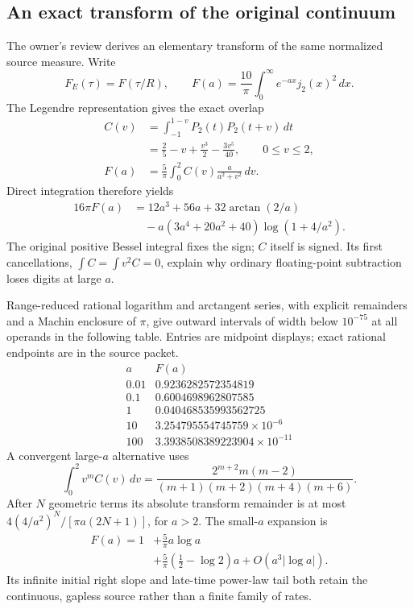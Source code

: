 \subsection{An exact transform of the original continuum}
\label{subsec:actual-continuum-transform-update}
The owner's review derives an elementary transform of the same normalized
source measure. Write
\[
 F_E(\tau)=F(\tau/R),\qquad
 F(a)=\frac{10}{\pi}\int_0^\infty e^{-ax}j_2(x)^2\,dx.
\]
The Legendre representation gives the exact overlap
\begin{align*}
 C(v)&=\int_{-1}^{1-v}P_2(t)P_2(t+v)\,dt\\
 &=\frac25-v+\frac{v^3}{2}-\frac{3v^5}{40},
       \qquad 0\leq v\leq2,\\
 F(a)&=\frac5\pi\int_0^2 C(v)\frac{a}{a^2+v^2}\,dv.
\end{align*}
Direct integration therefore yields
\begin{align}
 16\pi F(a)&=12a^3+56a+32\arctan(2/a)\nonumber\\
 &\quad-a(3a^4+20a^2+40)\log(1+4/a^2).
 \label{eq:exact-continuum-transform-update}
\end{align}
The original positive Bessel integral fixes the sign; $C$ itself is signed.
Its first cancellations, $\int C=\int v^2C=0$, explain why ordinary
floating-point subtraction loses digits at large $a$.

Range-reduced rational logarithm and arctangent series, with explicit
remainders and a Machin enclosure of $\pi$, give outward intervals of
width below $10^{-75}$ at all operands in the following table. Entries
are midpoint displays; exact rational endpoints are in the source packet.
\[
 \begin{array}{c|c}
 a&F(a)\\\hline
 0.01&0.9236282572354819\\
 0.1&0.6004698962807585\\
 1&0.040468535993562725\\
 10&3.254795554745759\times10^{-6}\\
 100&3.3938508389223904\times10^{-11}
 \end{array}
\]
A convergent large-$a$ alternative uses
\[
 \int_0^2v^mC(v)\,dv
 =\frac{2^{m+2}m(m-2)}{(m+1)(m+2)(m+4)(m+6)}.
\]
After $N$ geometric terms its absolute transform remainder is at most
$4(4/a^2)^N/[\pi a(2N+1)]$, for $a>2$. The small-$a$ expansion is
\[
 \begin{aligned}
 F(a)=1&+\frac5\pi a\log a\\
       &+\frac5\pi\left(\frac12-\log2\right)a
         +O(a^3|\log a|).
 \end{aligned}
\]
Its infinite initial right slope and late-time power-law tail both retain
the continuous, gapless source rather than a finite family of rates.


